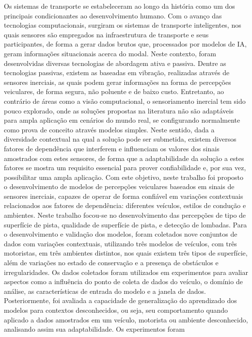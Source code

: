 
\begin{resumo}[Resumo]
    Os sistemas de transporte se estabeleceram ao longo da história como um dos principais condicionantes ao desenvolvimento humano. Com o avanço das tecnologias computacionais, surgiram os sistemas de transporte inteligentes, nos quais sensores são empregados na infraestrutura de transporte e seus participantes, de forma a gerar dados brutos que, processados por modelos de IA, geram informações situacionais acerca do modal. Neste contexto, foram desenvolvidas diversas tecnologias de abordagem ativa e passiva. Dentre as tecnologias passivas, existem as baseadas em vibração, realizadas através de sensores inerciais, as quais podem gerar informações na forma de percepções veiculares, de forma segura, não poluente e de baixo custo. Entretanto, ao contrário de áreas como a visão computacional, o sensoriamento inercial tem sido pouco explorado, onde as soluções propostas na literatura não são adaptáveis para ampla aplicação em cenários do mundo real, se configurando normalmente como prova de conceito através modelos simples. Neste sentido, dada a diversidade contextual na qual a solução pode ser submetida, existem diversos fatores de dependência que interferem e influenciam os valores dos sinais amostrados com estes sensores, de forma que a adaptabilidade da solução a estes fatores se mostra um requisito essencial para prover confiabilidade e, por sua vez, possibilitar uma ampla aplicação. Com este objetivo, neste trabalho foi proposto o desenvolvimento de modelos de percepções veiculares baseados em sinais de sensores inerciais, capazes de operar de forma confiável em variações contextuais relacionados aos fatores de dependência: diferentes veículos, estilos de condução e ambientes. Neste trabalho focou-se no desenvolvimento das percepções de tipo de superfície de pista, qualidade de superfície de pista, e detecção de lombadas. Para o desenvolvimento e validação dos modelos, foram coletados nove conjuntos de dados com variações contextuais, utilizando três modelos de veículos, com três motoristas, em três ambientes distintos, nos quais existem três tipos de superfície, além de variações no estado de conservação e a presença de obstáculos e irregularidades. Os dados coletados foram utilizados em experimentos para avaliar aspectos como a influência do ponto de coleta de dados do veículo, o domínio de análise, as características de entrada do modelo e a janela de dados. Posteriormente, foi avaliada a capacidade de generalização do aprendizado dos modelos para contextos desconhecidos, ou seja, seu comportamento quando aplicado a dados amostrados em um veículo, motorista ou ambiente desconhecido, analisando assim sua adaptabilidade. Os experimentos foram 
\end{resumo}
